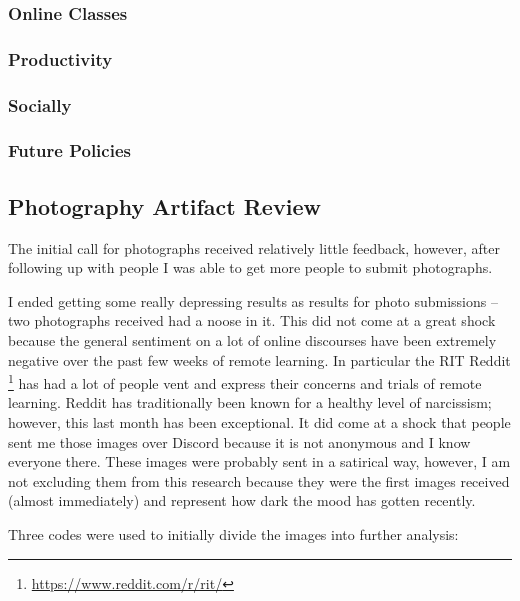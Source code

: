 \documentclass[12pt,
 reprint,
nofootinbib,
 amsmath,amssymb,
 aps,
]{revtex4-2}
\begin{document}
\subsubsection{Online Classes}


\subsubsection{Productivity}


\subsubsection{Socially}


\subsubsection{Future Policies}







\subsection{Photography Artifact Review}

The initial call for photographs received relatively little feedback, however, after following up with people I was able to get more people to submit photographs.

I ended getting some really depressing results as results for photo submissions -- two photographs received had a noose in it. This did not come at a great shock because the general sentiment on a lot of online discourses have been extremely negative over the past few weeks of remote learning. In particular the RIT Reddit \footnote{\url{https://www.reddit.com/r/rit/}} has had a lot of people vent and express their concerns and trials of remote learning. Reddit has traditionally been known for a healthy level of narcissism; however, this last month has been exceptional. It did come at a shock that people sent me those images over Discord because it is not anonymous and I know everyone there. These images were probably sent in a satirical way, however, I am not excluding them from this research because they were the first images received (almost immediately) and represent how dark the mood has gotten recently.

Three codes were used to initially divide the images into further analysis:
\end{document}
